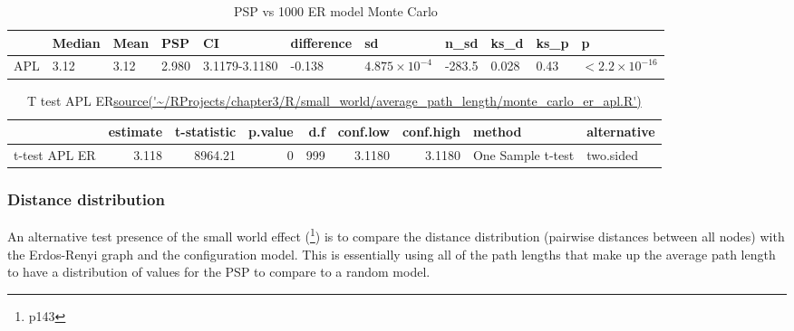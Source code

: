 \begin{table}[ht]
\centering
\begin{adjustbox}{width=\textwidth}
\begin{tabular}{lllllllllll}
  \toprule
 & Median & Mean & PSP& CI & difference & sd & n\_sd & ks\_d & ks\_p & p \\ 
  \midrule
APL & 3.12 & 3.12 & 2.980 &3.1179-3.1180 & -0.138 & $4.875 \times 10^{-4}$ & -283.5 & 0.028 & 0.43 & $<2.2 \times 10^{-16}$ \\ 
 
   \bottomrule
\end{tabular}
\end{adjustbox}
\caption{PSP vs 1000 ER model Monte Carlo} 
\end{table}




 
 
\begin{table}[ht]
\centering
\begin{adjustbox}{width=\textwidth}
\begin{tabular}{lrrrrrrll}
  \toprule
 & estimate & t-statistic & p.value & d.f & conf.low & conf.high & method & alternative \\ 
  \midrule
t-test APL ER & 3.118 & 8964.21 &    0 & 999 & 3.1180 & 3.1180 & One Sample t-test & two.sided \\ 
   \bottomrule
   
\end{tabular}
\end{adjustbox}
\caption{T test APL ER\url{source('~/RProjects/chapter3/R/small_world/average_path_length/monte_carlo_er_apl.R')}}
\label{tab:t test apl er}
\end{table}


\subsubsection{Distance distribution}

An alternative test presence of the small world effect (\cite{barabasi2016network}\footnote{p143}) is to compare the distance distribution (pairwise distances between all nodes) with the Erdos-Renyi graph and the configuration model. This is essentially using all of the path lengths that make up the average path length to have a distribution of values for the PSP to compare to a random model.

